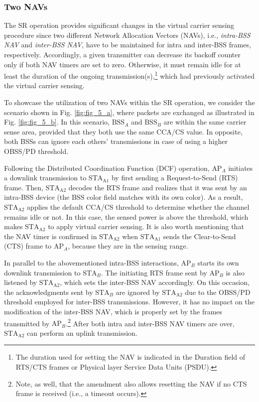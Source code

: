 \documentclass{article}
\begin{document}
\subsubsection{Two NAVs}
\label{section:two_navs}
The SR operation provides significant changes in the virtual carrier sensing procedure since two different Network Allocation Vectors (NAVs), i.e., \emph{intra-BSS NAV} and \emph{inter-BSS NAV}, have to be maintained for intra and inter-BSS frames, respectively. Accordingly, a given transmitter can decrease its backoff counter only if both NAV timers are set to zero. Otherwise, it must remain idle for at least the duration of the ongoing transmission(s),\footnote{The duration used for setting the NAV is indicated in the Duration field of RTS/CTS frames or Physical layer Service Data Units (PSDU).} which had previously activated the virtual carrier sensing. 

To showcase the utilization of two NAVs within the SR operation, we consider the scenario shown in Fig. \ref{fig:fig_5_a}, where packets are exchanged as illustrated in Fig. \ref{fig:fig_5_b}. In this scenario, $\text{BSS}_A$ and $\text{BSS}_B$ are within the same carrier sense area, provided that they both use the same CCA/CS value. In opposite, both BSSs can ignore each others' transmissions in case of using a higher OBSS/PD threshold.

Following the Distributed Coordination Function (DCF) operation, $\text{AP}_A$ initiates a downlink transmission to $\text{STA}_\text{A1}$ by first sending a Request-to-Send (RTS) frame. Then, $\text{STA}_\text{A2}$ decodes the RTS frame and realizes that it was sent by an intra-BSS device (the BSS color field matches with its own color). As a result, $\text{STA}_\text{A2}$ applies the default CCA/CS threshold to determine whether the channel remains idle or not. In this case, the sensed power is above the threshold, which makes $\text{STA}_\text{A2}$ to apply virtual carrier sensing. It is also worth mentioning that the NAV timer is confirmed in $\text{STA}_\text{A2}$ when $\text{STA}_\text{A1}$ sends the Clear-to-Send (CTS) frame to $\text{AP}_A$, because they are in the sensing range. 

In parallel to the abovementioned intra-BSS interactions, $\text{AP}_B$ starts its own downlink transmission to $\text{STA}_B$. The initiating RTS frame sent by $\text{AP}_B$ is also listened by $\text{STA}_\text{A2}$, which sets the inter-BSS NAV accordingly. On this occasion, the acknowledgments sent by $\text{STA}_B$ are ignored by $\text{STA}_\text{A2}$ due to the OBSS/PD threshold employed for inter-BSS transmissions. However, it has no impact on the modification of the inter-BSS NAV, which is properly set by the frames transmitted by $\text{AP}_B$.\footnote{Note, as well, that the amendment also allows resetting the NAV if no CTS frame is received (i.e., a timeout occurs).} After both intra and inter-BSS NAV timers are over, $\text{STA}_\text{A2}$ can perform an uplink transmission.
\end{document}
